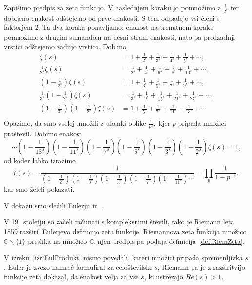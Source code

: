 \documentclass[mat1]{fmfdelo}
\begin{document}
\begin{dokaz}
Zapišimo predpis za zeta funkcijo. V naslednjem koraku jo pomnožimo z $\frac{1}{2^s}$ ter dobljeno enakost odštejemo od prve enakosti. S tem odpadejo vsi členi s faktorjem $2$. Ta dva koraka ponavljamo: enakost na trenutnem koraku pomnožimo z drugim sumandom na desni strani enakosti, nato pa predzadnji vrstici odštejemo zadnjo vrstico. Dobimo
\begin{align*}
	\zeta(s) &= 1 + \frac{1}{2^s} + \frac{1}{3^s} + \frac{1}{4^s} + \frac{1}{5^s} + \cdots, \nonumber \\
	\frac{1}{2^s} \zeta(s) &= \frac{1}{2^s} + \frac{1}{4^s} + \frac{1}{6^s} + \frac{1}{8^s} + \frac{1}{10^s} + \cdots, \nonumber \\
	\left(1-\frac{1}{2^s}\right) \zeta(s) &= 1 + \frac{1}{3^s} + \frac{1}{5^s} + \frac{1}{7^s} + \frac{1}{9^s} + \cdots, \nonumber \\
	\frac{1}{3^s} \left(1-\frac{1}{2^s}\right) \zeta(s) &= \frac{1}{3^s} + \frac{1}{9^s} + \frac{1}{15^s} + \frac{1}{21^s} + \frac{1}{27^s} + \cdots, \nonumber \\
	\left(1-\frac{1}{3^s}\right)\left (1-\frac{1}{2^s}\right) \zeta(s) &= 1 + \frac{1}{5^s} + \frac{1}{7^s} + \frac{1}{11^s} + \frac{1}{13^s} + \cdots \nonumber \\
\end{align*}
Opazimo, da smo vselej množili z ulomki oblike $\frac{1}{p^s},$ kjer $p$ pripada množici praštevil. Dobimo enakost
	\[ \cdots \left(1-\frac{1}{13^s}\right) \left(1-\frac{1}{11^s}\right) \left(1-\frac{1}{7^s}\right) \left(1-\frac{1}{5^s}\right) \left(1-\frac{1}{3^s}\right) 		\left(1-\frac{1}{2^s}\right) \zeta(s) = 1, \]
od koder lahko izrazimo
	\[ \zeta(s) = \frac{1}{ \left(1-\frac{1}{2^s}\right) \left(1-\frac{1}{3^s}\right) \left(1-\frac{1}{5^s}\right) \left(1-\frac{1}{7^s}\right) \left(1-\frac{1}{11^s}\right) \cdots} = \prod_{p}\frac{1}{1-p^{-s}}, \]
kar smo želeli pokazati.
\end{dokaz}

V dokazu smo sledili Eulerju in~\cite{riemannHyp}.

V 19.~stoletju so začeli računati s kompleksnimi števili, tako je Riemann leta 1859 razširil Eulerjevo definicijo zeta funkcije. Riemannova zeta funkcija množico  $\mathbb{C}\backslash\{1\}$ preslika na množico  $\mathbb{C}$, njen predpis pa podaja definicija~\ref{def:RiemZeta}.

\begin{opomba}
V izreku~\ref{izr:EulProdukt} nismo povedali, kateri množici pripada spremenljivka $s$. Euler je zvezo namreč formuliral za celoštevilske $s$, Riemann pa je z razširitvijo funkcije zeta dokazal, da enakost velja za vse $s$, ki ustrezajo $Re(s)>1$.
\end{opomba}
\end{document}
